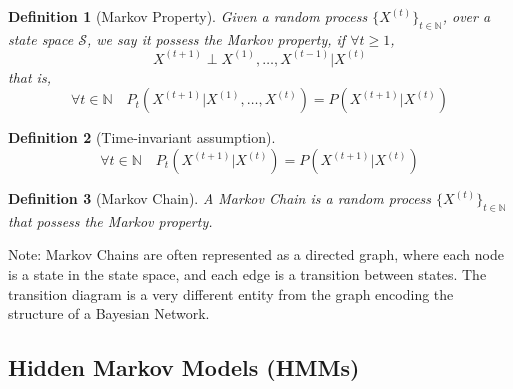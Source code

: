 \documentclass[11pt]{article}
\numberwithin{equation}{section}
\theoremstyle{boldStyle}
\theoremstyle{boldBlueStyle}
\theoremstyle{boldPurpleStyle}
\theoremstyle{boldRedStyle}
\newtheorem{definition}{Definition}[section]
\begin{document}
\begin{definition}[Markov Property]
    Given a random process $\{ X^{(t)} \}_{t\in \mathbb{N}}$, over a state space $\mathcal{S}$, we say it possess the Markov property, 
    if $\forall t \geq 1$, 
    \begin{equation*}
        X^{(t+1)} \perp X^{(1)}, \ldots ,X^{(t-1)} | X^{(t)}
    \end{equation*}
    that is, 
    \begin{equation*}
        \forall t \in \mathbb{N} \quad P_t(X^{(t+1)} | X^{(1)}, \ldots ,X^{(t)}) = P(X^{(t+1)} | X^{(t)})
    \end{equation*}
\end{definition}

\begin{definition}[Time-invariant assumption]
    \begin{equation*}
        \forall t \in \mathbb{N} \quad P_t(X^{(t+1)} | X^{(t)}) = P(X^{(t+1)} | X^{(t)})
    \end{equation*}
\end{definition}

\begin{definition}[Markov Chain]
    A Markov Chain is a random process $\{ X^{(t)} \}_{t\in \mathbb{N}}$ that possess the Markov property.
\end{definition}

Note: Markov Chains are often represented as a directed graph, where each node is a state in the state space, and each edge is a transition between states.
The transition diagram is a very different entity from the graph encoding the structure of a Bayesian Network.

\subsection{Hidden Markov Models (HMMs)}
\end{document}
